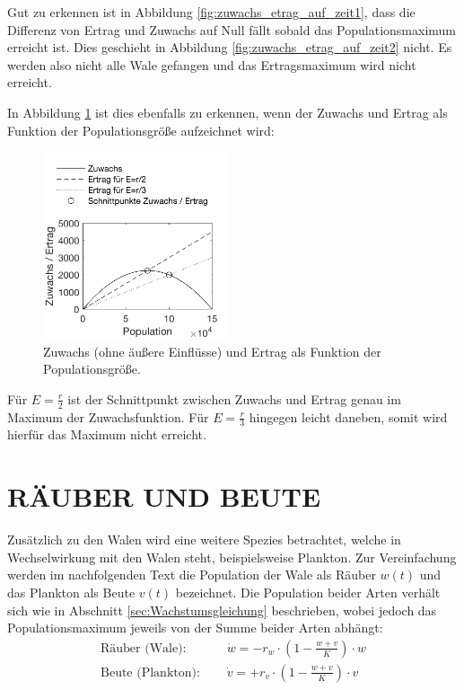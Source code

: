 \documentclass[a4paper,twoside]{article}
\begin{document}
	Gut zu erkennen ist in Abbildung \ref{fig:zuwachs_etrag_auf_zeit1}, dass die Differenz von Ertrag und Zuwachs auf Null fällt sobald das Populationsmaximum erreicht ist. Dies geschieht in Abbildung \ref{fig:zuwachs_etrag_auf_zeit2} nicht. Es werden also nicht alle Wale gefangen und das Ertragsmaximum wird nicht erreicht.

	\newpage
	In Abbildung \ref{fig:zuwachs_ertrag_zu_population} ist dies ebenfalls zu erkennen, wenn der Zuwachs und Ertrag als Funktion der Populationsgröße aufzeichnet wird:
	\begin{figure}[!h]
  		\centering
 		\includegraphics[width=5.5cm]{Diagramme/zuwachs_ertrag_zu_population.png}
  		\caption{Zuwachs (ohne äußere Einflüsse) und Ertrag als Funktion der Populationsgröße.}
  		\label{fig:zuwachs_ertrag_zu_population}
	\end{figure}

	Für \(E=\frac{r}{2}\) ist der Schnittpunkt zwischen Zuwachs und Ertrag genau im Maximum der Zuwachsfunktion. Für \(E=\frac{r}{3}\) hingegen leicht daneben, somit wird hierfür das Maximum nicht erreicht.
	
	\newpage
	
	\section{\uppercase{Räuber und Beute}}\label{sec:Raeuber_Beute}
	
	Zusätzlich zu den Walen wird eine weitere Spezies betrachtet, welche in Wechselwirkung mit den Walen steht, beispielsweise Plankton. Zur Vereinfachung werden im nachfolgenden Text die Population der Wale als Räuber \(w(t)\) und das Plankton als Beute \(v(t)\) bezeichnet. Die Population beider Arten verhält sich wie in Abschnitt \ref{sec:Wachstumsgleichung} beschrieben, wobei jedoch das Populationsmaximum jeweils von der Summe beider Arten abhängt:
	\begin{align*}
		\textrm{Räuber (Wale): } &\quad \dot{w} = -r_w \cdot \left(1 - \frac{w+v}{K} \right) \cdot w \\
		\textrm{Beute (Plankton): } &\quad \dot{v} = +r_v \cdot \left(1 - \frac{w+v}{K} \right) \cdot v
	\end{align*}
\end{document}
